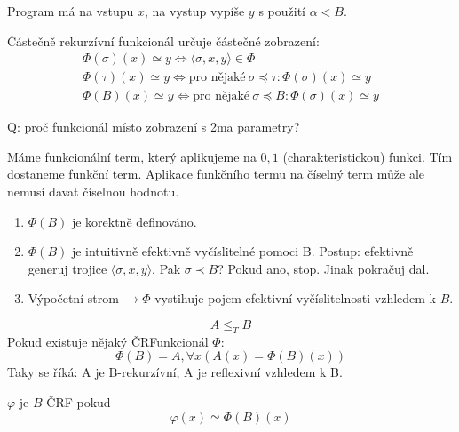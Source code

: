 \begin{example}
	Program má na vstupu $x$, na vystup vypíše $y$ s použití $\alpha < B$.
\end{example}

\begin{definition}
	Částečně rekurzívní funkcionál určuje částečné zobrazení:
	\begin{gather*}
		\Phi(\sigma)(x) \simeq y \iff \langle \sigma, x, y \rangle \in \Phi \\
		\Phi(\tau)(x) \simeq y \iff \text{pro nějaké}\ \sigma \preccurlyeq \tau: \Phi(\sigma)(x) \simeq y\\
		\Phi(B)(x) \simeq y \iff \text{pro nějaké}\ \sigma \preccurlyeq B: \Phi(\sigma)(x) \simeq y
	\end{gather*}
\end{definition}

Q: proč funkcionál místo zobrazení s 2ma parametry?

\begin{note}
	Máme funkcionální term, který aplikujeme na $0,1$ (charakteristickou) funkci.
	Tím dostaneme funkční term. Aplikace funkčního termu na číselný term může ale nemusí davat číselnou hodnotu.
\end{note}

\begin{properties}
	\begin{enumerate}
		\item $\Phi(B)$ je korektně definováno.
		\item $\Phi(B)$ je intuitivně efektivně vyčíslitelné pomoci B.
			Postup: efektivně generuj trojice $\langle \sigma, x, y \rangle$.
			Pak $\sigma \prec B$? Pokud ano, stop.
			Jinak pokračuj dal.
		\item Výpočetní strom $\to \Phi$ vystihuje pojem efektivní vyčíslitelnosti vzhledem k $B$.
	\end{enumerate}
\end{properties}

\begin{definition}[T-Převoditelnost]
	\[ A \leq_T B \]
	Pokud existuje nějaký ČRFunkcionál $\Phi$:
	\[ \Phi(B) = A, \forall x( A(x) = \Phi(B)(x)) \]
	Taky se říká: A je B-rekurzívní, A je reflexivní vzhledem k B.
\end{definition}

\begin{definition}
	$\varphi$ je $B$-ČRF pokud
	\[ \varphi(x) \simeq \Phi(B)(x) \]
\end{definition}

